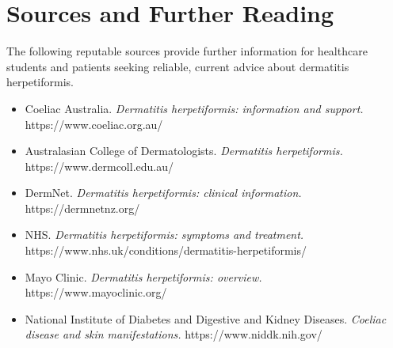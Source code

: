 \section*{Sources and Further Reading}
The following reputable sources provide further information for healthcare students and patients seeking reliable, current advice about dermatitis herpetiformis.

\begin{itemize}
    \item Coeliac Australia. \textit{Dermatitis herpetiformis: information and support.} https://www.coeliac.org.au/
    \item Australasian College of Dermatologists. \textit{Dermatitis herpetiformis.} https://www.dermcoll.edu.au/
    \item DermNet. \textit{Dermatitis herpetiformis: clinical information.} https://dermnetnz.org/
    \item NHS. \textit{Dermatitis herpetiformis: symptoms and treatment.} https://www.nhs.uk/conditions/dermatitis-herpetiformis/
    \item Mayo Clinic. \textit{Dermatitis herpetiformis: overview.} https://www.mayoclinic.org/
    \item National Institute of Diabetes and Digestive and Kidney Diseases. \textit{Coeliac disease and skin manifestations.} https://www.niddk.nih.gov/
\end{itemize}
